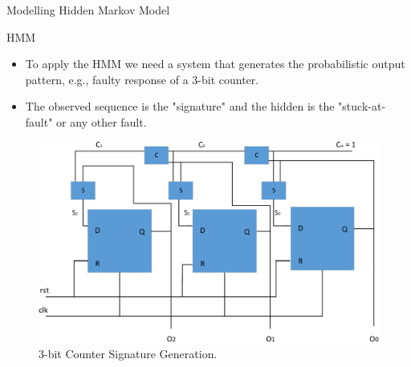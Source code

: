 \documentclass[aspectratio=1610]{beamer}
\begin{document}
\begin{frame}{Modelling Hidden Markov Model}

\begin{block}{HMM}

\end{block}

\begin{itemize}

\item To apply the HMM we need a system that generates the probabilistic output pattern, e.g., faulty response of a 3-bit counter.

\item The observed sequence is the "signature" and the hidden is the "stuck-at-fault" or any other fault.




\end{itemize}





\begin{figure}[tb!]
 \centering
  \captionsetup{justification=centering}    
   \includegraphics[scale=0.3]{Figures/counter.pdf}
   \caption{3-bit Counter Signature Generation.}
\label{fig:counter}
\end{figure}
\end{frame}
\end{document}
